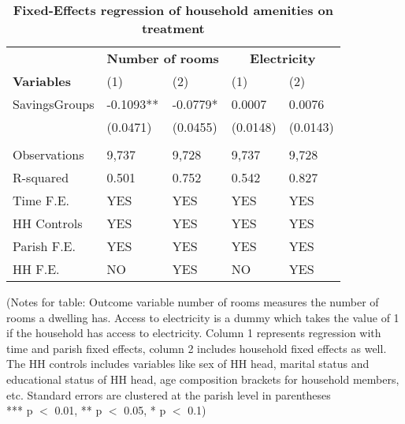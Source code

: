 \begin{table}[!h]
\centering
\begin{tabular}{lllll}
 \\
& \multicolumn{2}{c}{\bfseries  Number of rooms} &   \multicolumn{2}{c}{\bfseries Electricity} \\
\cline{1-5}
 {\bfseries Variables} & (1) & (2)  & (1) & (2)
 &  \\
 \hline
SavingsGroups  & -0.1093** & 	-0.0779* &	0.0007	& 0.0076
 \\
  & (0.0471) &	(0.0455) &	(0.0148) &	(0.0143) \\
 &  \\
Observations & 9,737	& 9,728	& 9,737	& 9,728 \\
R-squared & 0.501	& 0.752	& 0.542 &	0.827 \\
Time F.E. & YES & YES & YES & YES \\
HH Controls & YES & YES & YES & YES \\
Parish F.E. & YES & YES  & YES & YES  \\
HH F.E.  & NO & YES  & NO & YES \\ \hline
\cline{1-5}
\end{tabular}
\caption{\bfseries Fixed-Effects regression of household amenities on treatment}
\footnotesize{(Notes for table: Outcome variable number of rooms measures the number of rooms a dwelling has. Access to electricity is a dummy which takes the value of 1 if the household has access to electricity. Column 1 represents regression with time and parish fixed effects, column 2 includes household fixed effects as well. The HH controls includes variables like sex of HH head, marital status and educational status of HH head, age composition brackets for household members, etc. Standard errors are clustered at the parish level in parentheses\\
*** p $<$ 0.01, ** p $<$ 0.05, * p $<$ 0.1)} 
\end{table}

